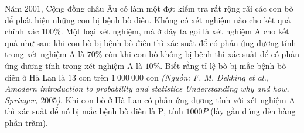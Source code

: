 \begin{ex}%
	Năm $2001$, Cộng đồng châu Âu có làm một đợt kiểm tra rất rộng rãi các con bò để phát hiện những con bị bệnh bò điên. Không có xét nghiệm nào cho kết quả chính xác $100 \%$. Một loại xét nghiệm, mà ở đây ta gọi là xét nghiệm A cho kết quả như sau: khi con bò bị bệnh bò điên thì xác suất để có phản ứng dương tính trong xét nghiệm A là $70 \%$ còn khi con bò không bị bệnh thì xác suất để có phản ứng dương tính trong xét nghiệm A là $10 \%$. Biết rằng tỉ lệ bò bị mắc bệnh bò điên ở Hà Lan là $13$ con trên $1~000~000$ con \textit{(Nguồn: F. M. Dekking et al., Amodern introduction to probability and statistics Understanding why and how, Springer, $2005$)}. Khi con bò ở Hà Lan có phản ứng dương tính với xét nghiệm A thì xác suất để nó bị mắc bệnh bò điên là $\mathrm{P}$, tính $1000P$ (lấy gần đúng đến hàng phần trăm).
\end{ex}

